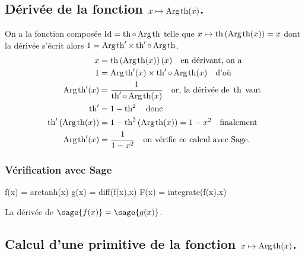 \documentclass[a4paper,landscape,17pt]{extreport} %
\def\Id{\ensuremath{\mathrm{Id}}}
\renewcommand{\tanh}{\mathop{\mathrm{th}}}
\renewcommand{\arg}{\mathop{\mathrm{Arg}}}
\begin{document}
\subsection{Dérivée de la fonction $x \mapsto \arg\mspace{-1mu}\tanh(x)$.}
On a la fonction composée $\Id = \tanh \circ \arg\mspace{-1mu}\tanh$ telle que $x\mapsto\tanh\left(\arg\mspace{-1mu}\tanh(x)\right)=x$ dont la dérivée s'écrit alors $1= \arg\mspace{-1mu}\tanh\nolimits' \times \tanh\nolimits'\circ\arg\mspace{-1mu}\tanh$.
\begin{align*}
x & =\tanh\left(\arg\mspace{-1mu}\tanh(x)\right)(x) \quad \textrm{en dérivant, on a}\\
1 & = \arg\mspace{-1mu}\tanh\nolimits'(x) \times \tanh\nolimits'\circ\arg\mspace{-1mu}\tanh(x) \quad \textrm{d'où}\\
\arg\mspace{-1mu}\tanh\nolimits'(x) & =\frac{1}{ \tanh\nolimits'\circ\arg\mspace{-1mu}\tanh(x)}\quad \textrm{or, la dérivée de } \tanh \; \textrm{vaut}\\
\tanh\nolimits' & = 1-\tanh\nolimits^2 \quad \textrm{donc} \\
\tanh\nolimits'\left(\arg\mspace{-1mu}\tanh(x)\right) & = 1 - \tanh\nolimits^2 \left(\arg\mspace{-1mu}\tanh(x)\right) = 1 - x^2 \quad \textrm{finalement}\\
\arg\mspace{-1mu}\tanh\nolimits'(x) & = \frac{1}{ 1- x^2} \quad \textrm{on vérifie ce calcul avec Sage.}
\end{align*}


\subsubsection{Vérification avec Sage}


\begin{sageblock}
    f(x) = arctanh(x)
    g(x) = diff(f(x),x)
    F(x) = integrate(f(x),x)
\end{sageblock}

La dérivée de $\sage{f(x)} = \sage{g(x)} $.


\subsection{Calcul d'une primitive de la fonction  $x \mapsto \arg\mspace{-1mu}\tanh(x)$.}
\end{document}
